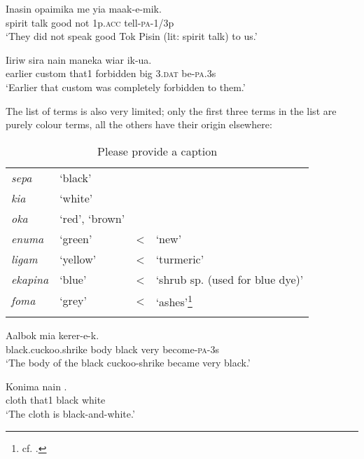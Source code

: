 \ea%
\label{ex:3:x1760}
\gll Inasin opaimika  me yia maak-e-mik. \\
spirit talk good not 1p.\textsc{acc} tell-\textsc{pa}-1/3p\\
\glt`They did not speak good Tok Pisin (lit: spirit talk) to us.'
\z

\ea%
\label{ex:3:x1759}
\gll Iiriw sira nain  maneka wiar ik-ua. \\
earlier custom that1 forbidden big 3.\textsc{dat} be-\textsc{pa}.3s\\
\glt`Earlier that custom was completely forbidden to them.'
\z

The list of  terms is also very limited; only the first three terms in the list are purely colour terms, all the others have their origin elsewhere:

\begin{table}
\caption{Please provide a caption}
 
\begin{tabular}{>{\itshape}llcl}
\mytoprule
sepa &`black'&&\\
kia &`white'&&\\
oka &`red', `brown'&&\\
enuma &`green' &{\textless} &`new'\\
ligam &`yellow' &{\textless} &`turmeric'\\
ekapina &`blue' &{\textless} &`shrub sp. (used for blue dye)'\\
foma &`grey' &{\textless} &`ashes'\footnote{cf. \cite[4]{BerlinEtAl1969}.}\\
\mybottomrule
\end{tabular}

\end{table}

\ea%
\label{ex:3:x1753}
\gll Aalbok mia    kerer-e-k. \\
black.cuckoo.shrike body black very become-\textsc{pa}-3s\\
\glt`The body of the black cuckoo-shrike became very black.'
\z

\ea%
\label{ex:3:x109}
\gll Konima nain  . \\
cloth that1 black white\\
\glt`The cloth is black-and-white.'
\z

